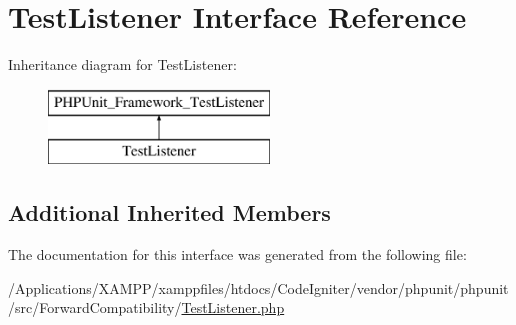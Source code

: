 \hypertarget{interface_p_h_p_unit_1_1_framework_1_1_test_listener}{}\section{Test\+Listener Interface Reference}
\label{interface_p_h_p_unit_1_1_framework_1_1_test_listener}
Inheritance diagram for Test\+Listener\+:\begin{figure}[H]
\begin{center}
\leavevmode
\includegraphics[height=2.000000cm]{interface_p_h_p_unit_1_1_framework_1_1_test_listener}
\end{center}
\end{figure}
\subsection*{Additional Inherited Members}


The documentation for this interface was generated from the following file\+:\begin{DoxyCompactItemize}
\item 
/\+Applications/\+X\+A\+M\+P\+P/xamppfiles/htdocs/\+Code\+Igniter/vendor/phpunit/phpunit/src/\+Forward\+Compatibility/\mbox{\hyperlink{_forward_compatibility_2_test_listener_8php}{Test\+Listener.\+php}}\end{DoxyCompactItemize}
